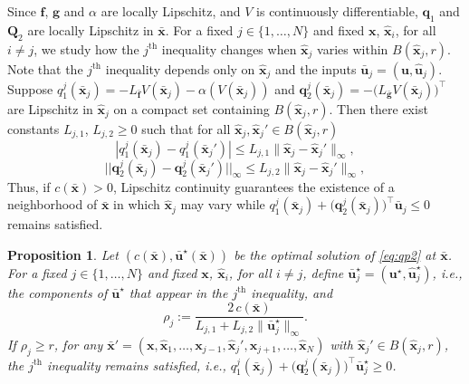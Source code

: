 \documentclass[letterpaper, 10 pt, conference]{ieeeconf}  %
\newtheorem{proposition}{Proposition}
\begin{document}
Since $\mathbf{f}$, $\mathbf{g}$ and $\alpha$ are locally Lipschitz, and $V$ is continuously differentiable, $\mathbf{q}_1$ and $\mathbf{Q}_2$ are locally Lipschitz in $\bar{\mathbf{x}}$. For a fixed $j \in \{1, \dots, N\}$ and fixed $\mathbf{x}$, $\hat{\mathbf{x}}_i$, for all $i \neq j$, we study how the $j^\text{th}$ inequality changes when $\hat{\mathbf{x}}_j$ varies within $B(\hat{\mathbf{x}}_j, r)$. Note that the $j^\text{th}$ inequality depends only on $\hat{\mathbf{x}}_j$ and the inputs $\bar{\mathbf{u}}_j = (\mathbf{u}, \hat{\mathbf{u}}_j)$. Suppose $q_1^j(\bar{\mathbf{x}}_j) = -L_{\bar{\mathbf{f}}} V (\bar{\mathbf{x}}_j) - \alpha(V(\bar{\mathbf{x}}_j))$ and $\mathbf{q}_2^j(\bar{\mathbf{x}}_j) = -\big( L_{\bar{\mathbf{g}}} V (\bar{\mathbf{x}}_j) \big)^\top$ are Lipschitz in $\hat{\mathbf{x}}_j$ on a compact set containing $B(\hat{\mathbf{x}}_j, r)$. Then there exist constants $L_{j, 1}$, $L_{j, 2} \ge 0$ such that for all $\hat{\mathbf{x}}_j,\hat{\mathbf{x}}_j' \in B(\hat{\mathbf{x}}_j, r)$
\[
    |q_1^j(\bar{\mathbf{x}}_j) - q_1^j(\bar{\mathbf{x}}_j')| \le L_{j,1} \|\hat{\mathbf{x}}_j - \hat{\mathbf{x}}_j'\|_\infty,
\]
\[
    ||\mathbf{q}_2^j(\bar{\mathbf{x}}_j) - \mathbf{q}_2^j(\bar{\mathbf{x}}_j')||_\infty \le L_{j,2} \|\hat{\mathbf{x}}_j - \hat{\mathbf{x}}_j'\|_\infty,
\]
Thus, if $c(\bar{\mathbf{x}}) > 0$, Lipschitz continuity guarantees the existence of a neighborhood of $\bar{\mathbf{x}}$ in which $\hat{\mathbf{x}}_j$ may vary while $q_1^j(\bar{\mathbf{x}}_j) + \big( \mathbf{q}_2^j(\bar{\mathbf{x}}_j) \big)^\top \bar{\mathbf{u}}_j \le 0$ remains satisfied. 

\begin{proposition}
    Let $(c(\bar{\mathbf{x}}), \bar{\mathbf{u}}^\star(\bar{\mathbf{x}}))$ be the optimal solution of \eqref{eq:qp2} at $\bar{\mathbf{x}}$. For a fixed $j \in \{1,\dots,N\}$ and fixed $\mathbf{x}$, $\hat{\mathbf{x}}_i$, for all $i \neq j$,  define $\bar{\mathbf{u}}_j^\star = (\mathbf{u}^\star, \hat{\mathbf{u}}_j^\star)$, i.e., the components of $\bar{\mathbf{u}}^\star$ that appear in the $j^\text{th}$ inequality, and
    \[
        \rho_j := \frac{2 \, c(\bar{\mathbf{x}})} {L_{j,1}+L_{j,2}\|\bar{\mathbf{u}}_j^\star\|_\infty}.
    \]
    If $\rho_j \ge r$, for any $\bar{\mathbf{x}}' = (\mathbf{x}, \hat{\mathbf{x}}_1, \dots, \mathbf{x}_{j-1}, \hat{\mathbf{x}}_j', \mathbf{x}_{j+1}, \dots, \hat{\mathbf{x}}_N)$ with $\hat{\mathbf{x}}_j' \in B(\hat{\mathbf{x}}_j,r)$, the $j^\text{th}$ inequality remains satisfied, i.e., $q_1^j(\bar{\mathbf{x}}_j) + \big( \mathbf{q}_2^j(\bar{\mathbf{x}}_j) \big)^\top \bar{\mathbf{u}}_j^\star \ge 0$.
\end{proposition}
\end{document}
